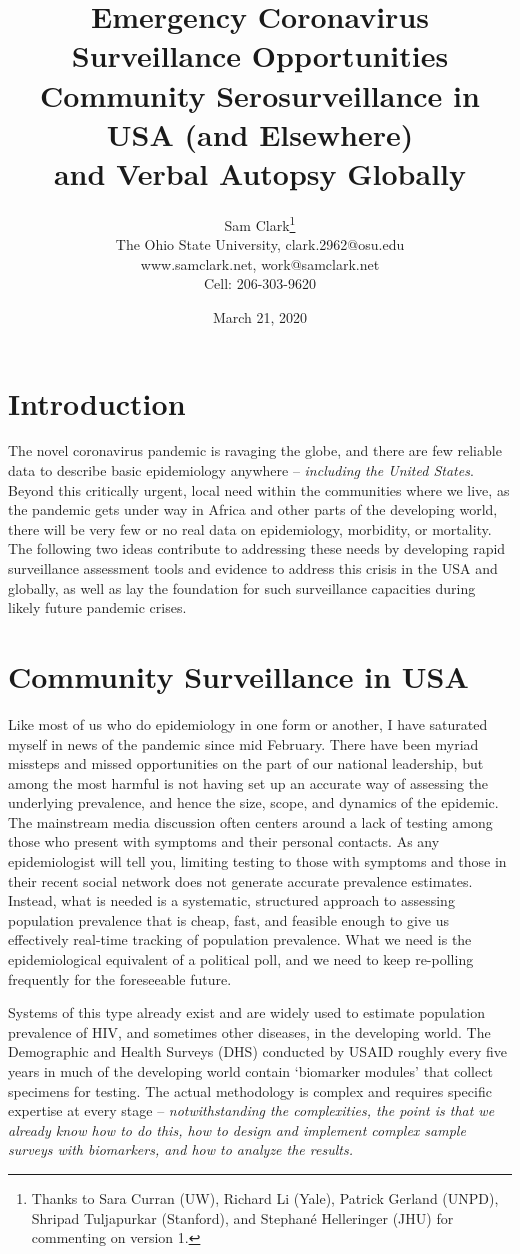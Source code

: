 \documentclass[12pt]{article}
\title{Emergency Coronavirus Surveillance Opportunities\\[10pt] \large{Community Serosurveillance in USA (and Elsewhere)\\ and Verbal Autopsy Globally}}
\author{Sam Clark\thanks{Thanks to Sara Curran (UW), Richard Li (Yale), Patrick Gerland (UNPD), Shripad Tuljapurkar (Stanford), and Stephan\'e Helleringer (JHU) for commenting on version 1.}\\
The Ohio State University, clark.2962@osu.edu\\
www.samclark.net, work@samclark.net\\
Cell: 206-303-9620}
\date{March 21, 2020}
\begin{document}
\maketitle


\section{Introduction}

The novel coronavirus pandemic is ravaging the globe, and there are few reliable data to describe basic epidemiology anywhere -- \textit{including the United States}.  Beyond this critically urgent, local need within the communities where we live, as the pandemic gets under way in Africa and other parts of the developing world, there will be very few or no real data on epidemiology, morbidity, or mortality.  The following two ideas contribute to addressing these needs by developing rapid surveillance assessment tools and evidence to address this crisis in the USA and globally, as well as lay the foundation for such surveillance capacities during likely future pandemic crises.


\section{Community Surveillance in USA}

Like most of us who do epidemiology in one form or another, I have saturated myself in news of the pandemic since mid February.  There have been myriad missteps and missed opportunities on the part of our national leadership, but among the most harmful is not having set up an accurate way of assessing the underlying prevalence, and hence the size, scope, and dynamics of the epidemic.  The mainstream media discussion often centers around a lack of testing among those who present with symptoms and their personal contacts.  As any epidemiologist will tell you, limiting testing to those with symptoms and those in their recent social network does not generate accurate prevalence estimates.  Instead, what is needed is a systematic, structured approach to assessing population prevalence that is cheap, fast, and feasible enough to give us effectively real-time tracking of population prevalence.  What we need is the epidemiological equivalent of a political poll, and we need to keep re-polling frequently for the foreseeable future.

Systems of this type already exist and are widely used to estimate population prevalence of HIV, and sometimes other diseases, in the developing world.  The Demographic and Health Surveys (DHS) conducted by USAID roughly every five years in much of the developing world contain `biomarker modules' that collect specimens for testing.  The actual methodology is complex and requires specific expertise at every stage -- \textit{notwithstanding the complexities, the point is that we already know how to do this, how to design and implement complex sample surveys with biomarkers, and how to analyze the results.}
\end{document}
